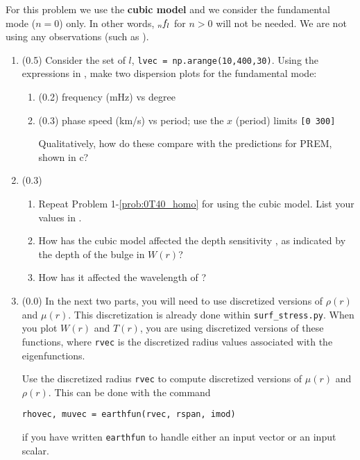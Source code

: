 \documentclass[11pt,titlepage,fleqn]{article}
\newcommand{\tfiless}{{\tt surf\_stress.py}}
\begin{document}
For this problem we use the {\bf cubic model} and we consider the fundamental mode ($n=0$) only. In other words, $\mbox{${}_{n\hspace{-0.2 mm}}f_l$}$ for $n > 0$ will not be needed. We are not using any observations (such as ).

\begin{enumerate}
\item (0.5) Consider the set of $l$, \verb+lvec = np.arange(10,400,30)+. Using the expressions in , make two dispersion plots for the fundamental mode:
%
\begin{enumerate}
\item (0.2) frequency (mHz) vs degree

\item (0.3) phase speed (km/s) vs period; use the $x$ (period) limits \verb+[0 300]+

Qualitatively, how do these compare with the predictions for PREM, shown in c?
\end{enumerate}

\item (0.3)
%
\begin{enumerate}
\item Repeat Problem 1-\ref{prob:0T40_homo} for  using the cubic model. List your values in .
\item How has the cubic model affected the depth sensitivity , as indicated by the depth of the bulge in $W(r)$?
\item How has it affected the wavelength of ?
\end{enumerate}

\label{prob:0T40_cubic}


\item (0.0) In the next two parts, you will need to use discretized versions of $\rho(r)$ and $\mu(r)$. This discretization is already done within \tfiless. When you plot $W(r)$ and $T(r)$, you are using discretized versions of these functions, where \verb+rvec+ is the discretized radius values associated with the eigenfunctions.

Use the discretized radius \verb+rvec+ to compute discretized versions of $\mu(r)$ and $\rho(r)$. This can be done with the command
%
\begin{verbatim}
rhovec, muvec = earthfun(rvec, rspan, imod)
\end{verbatim}
%
if you have written \verb+earthfun+ to handle either an input vector or an input scalar.


\end{enumerate}
\end{document}
